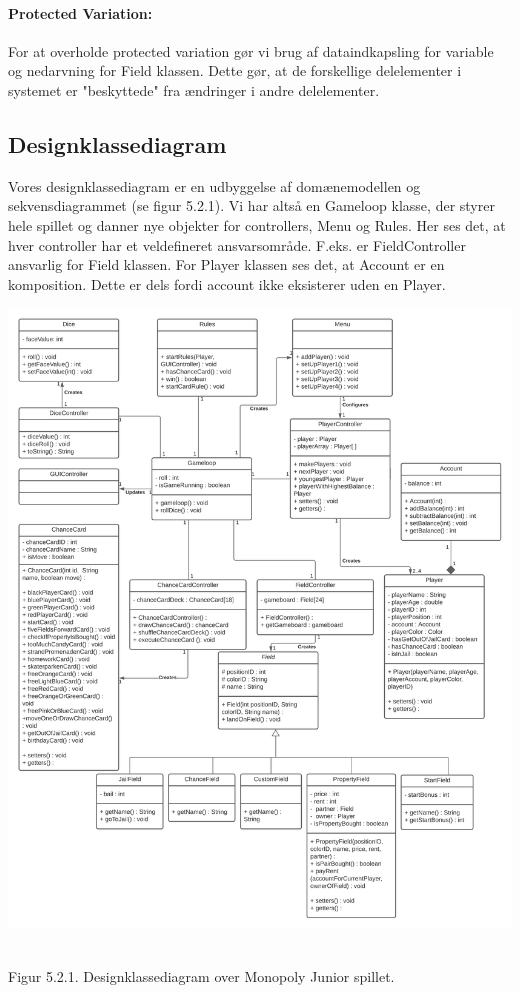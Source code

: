 \begin{flushleft}
\paragraph*{Protected Variation:}
For at overholde protected variation gør vi brug af dataindkapsling for variable og nedarvning for Field klassen. Dette gør, at de forskellige delelementer i systemet er "beskyttede" fra ændringer i andre delelementer.

\subsection{Designklassediagram}
Vores designklassediagram er en udbyggelse af domænemodellen og sekvensdiagrammet (se figur 5.2.1). Vi har altså en Gameloop klasse, der styrer hele spillet og danner nye objekter for controllers, Menu og Rules. Her ses det, at hver controller har et veldefineret ansvarsområde. F.eks. er FieldController ansvarlig for Field klassen. For Player klassen ses det, at Account er en komposition. Dette er dels fordi account ikke eksisterer uden en Player.
\begin{center}
\includegraphics[width=1\textwidth]{Report/figures/Class Diagram.png}~\\[0cm]
\end{center}
Figur 5.2.1. Designklassediagram over Monopoly Junior spillet.
\end{flushleft}